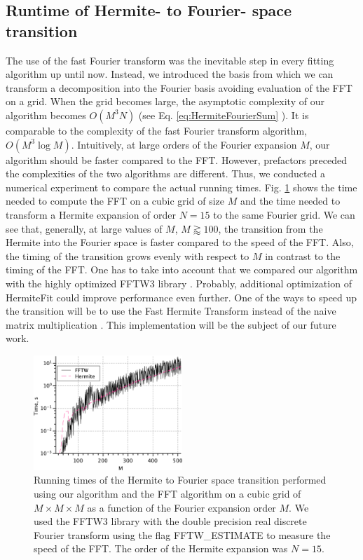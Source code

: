 \subsection{Runtime of Hermite- to Fourier- space transition}
The use of the fast Fourier transform was the inevitable step in every fitting algorithm up until now. 
Instead, we introduced the basis from which we can 
transform a decomposition into the Fourier basis avoiding evaluation of the FFT on a grid. 
When the grid becomes large, %
the asymptotic complexity of our algorithm becomes $O\left( M^3 N \right)$ (see Eq. \ref{eq:HermiteFourierSum}
). It is comparable to the complexity of the fast Fourier transform 
algorithm, $O\left( M^3 \log M   \right)$. 
Intuitively, at large orders of the Fourier expansion $M$, our algorithm should be faster compared to the FFT. 
However, prefactors preceded the complexities of the two algorithms are different. Thus, we conducted 
a numerical experiment to compare the actual running times. 
Fig. \ref{fig:Hermite_FFT_speed} shows the time needed to compute the FFT on a cubic grid of size $M$ and the 
time needed to transform a Hermite expansion of order $N=15$ to the same Fourier grid. 
%
We can see that, generally, at large values of $M$, $M\gtrapprox 100$, the transition from the Hermite into the Fourier space is faster compared to the speed of the FFT. 
Also, the timing of the transition grows evenly with respect to $M$ in contrast to the timing of the FFT.
%
One has to take into account that we compared our algorithm with the highly optimized FFTW3 library \cite{frigo2005design}. 
Probably, additional optimization of HermiteFit could improve performance even further. One of the ways to speed up the transition 
will be to use the Fast Hermite Transform instead of the naive matrix multiplication \cite{leibon2008fast}. This implementation will be the subject of our future work.

\begin{figure}[h]
\label{fig:Hermite_FFT_speed}
\begin{centering}
\includegraphics[width=0.5\textwidth]{Hermite/Fig/figure9.pdf}
\par\end{centering}
\caption[Running times of the Hermite to Fourier space transition and FFTW]{Running times of the Hermite to Fourier space transition performed using our algorithm and the FFT algorithm on a cubic grid of $M\times M\times M$ as a function of the Fourier expansion order $M$.
We used the FFTW3 library \cite{frigo2005design} with the double precision real discrete Fourier transform using the flag FFTW\_ESTIMATE to measure the speed of the FFT. The order of the Hermite expansion was $N=15$.}
\end{figure}

